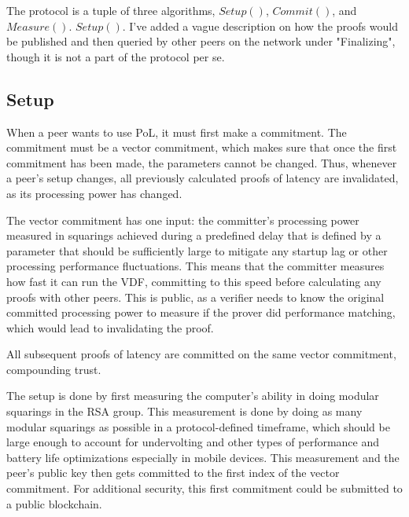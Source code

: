 The protocol is a tuple of three algorithms, \(Setup()\), \(Commit()\), and \(Measure()\). \(Setup()\). I've added a vague description on how the proofs would be published and then queried by other peers on the network under "Finalizing", though it is not a part of the protocol per se.

\subsection{Setup}
When a peer wants to use PoL, it must first make a commitment. The commitment must be a vector commitment, which makes sure that once the first commitment has been made, the parameters cannot be changed. Thus, whenever a peer's setup changes, all previously calculated proofs of latency are invalidated, as its processing power has changed.

The vector commitment has one input: the committer's processing power measured in squarings achieved during a predefined delay that is defined by a parameter that should be sufficiently large to mitigate any startup lag or other processing performance fluctuations. This means that the committer measures how fast it can run the VDF, committing to this speed before calculating any proofs with other peers. This is public, as a verifier needs to know the original committed processing power to measure if the prover did performance matching, which would lead to invalidating the proof.

All subsequent proofs of latency are committed on the same vector commitment, compounding trust.

The setup is done by first measuring the computer's ability in doing modular squarings in the RSA group. This measurement is done by doing as many modular squarings as possible in a protocol-defined timeframe, which should be large enough to account for undervolting and other types of performance and battery life optimizations especially in mobile devices. This measurement and the peer's public key then gets committed to the first index of the vector commitment. For additional security, this first commitment could be submitted to a public blockchain.

